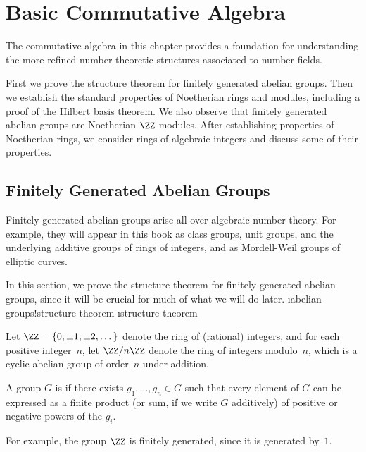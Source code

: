 
\chapter{Basic Commutative Algebra}

The commutative algebra in this chapter provides a
foundation for understanding the more refined number-theoretic
structures associated to number fields.

First we prove the structure theorem for finitely generated abelian
groups.  Then we establish the standard properties of Noetherian rings
and modules, including a proof of the Hilbert basis theorem.  We also
observe that finitely generated abelian groups are Noetherian
$\ZZ$-modules.  After establishing
properties of Noetherian rings, we consider rings of algebraic
integers and discuss some of their properties.

\section{Finitely Generated Abelian Groups}\label{sec:fg}
Finitely generated abelian groups arise all over algebraic number
theory.  For example, they will appear in this book as class groups,
unit groups, and the underlying additive groups of rings of integers,
and as Mordell-Weil groups of elliptic curves.

In this section, we prove the structure theorem for finitely generated
abelian groups, since it will be crucial for much of what we will do
later. \i{abelian groups!structure theorem} \i{structure theorem}

Let $\ZZ=\{0,\pm 1, \pm 2, \dots\}$ denote the ring of (rational)
integers, and for each positive integer~$n$, let $\ZZ/n\ZZ$ denote the
ring of integers modulo~$n$, which is a cyclic abelian group of
order~$n$ under addition.

\begin{definition}
  A group $G$ is  if there exists
  $g_1,\dots, g_n \in G$ such that every element of $G$ can be
  expressed as a finite product (or sum, if we write $G$ additively)
  of positive or negative powers of the $g_i$.
\end{definition}
For example, the group $\ZZ$ is finitely generated, since it is generated
by~$1$.

